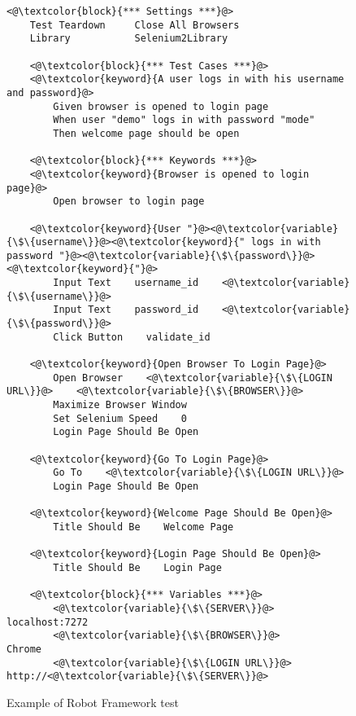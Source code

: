 \begin{figure}
\caption{Example of Robot Framework test}
\label{fig:robot-script}
\begin{minipage}{\linewidth}
\begin{lstlisting}[]
    <@\textcolor{block}{*** Settings ***}@>
    Test Teardown     Close All Browsers
    Library           Selenium2Library
    
    <@\textcolor{block}{*** Test Cases ***}@>
    <@\textcolor{keyword}{A user logs in with his username and password}@>
        Given browser is opened to login page
        When user "demo" logs in with password "mode"
        Then welcome page should be open
    
    <@\textcolor{block}{*** Keywords ***}@>
    <@\textcolor{keyword}{Browser is opened to login page}@>
        Open browser to login page
    
    <@\textcolor{keyword}{User "}@><@\textcolor{variable}{\$\{username\}}@><@\textcolor{keyword}{" logs in with password "}@><@\textcolor{variable}{\$\{password\}}@><@\textcolor{keyword}{"}@>
        Input Text    username_id    <@\textcolor{variable}{\$\{username\}}@>
        Input Text    password_id    <@\textcolor{variable}{\$\{password\}}@>
        Click Button    validate_id
    
    <@\textcolor{keyword}{Open Browser To Login Page}@>
        Open Browser    <@\textcolor{variable}{\$\{LOGIN URL\}}@>    <@\textcolor{variable}{\$\{BROWSER\}}@>
        Maximize Browser Window
        Set Selenium Speed    0
        Login Page Should Be Open        
    
    <@\textcolor{keyword}{Go To Login Page}@>
        Go To    <@\textcolor{variable}{\$\{LOGIN URL\}}@>
        Login Page Should Be Open
        
    <@\textcolor{keyword}{Welcome Page Should Be Open}@>
        Title Should Be    Welcome Page
        
    <@\textcolor{keyword}{Login Page Should Be Open}@>
        Title Should Be    Login Page
    
    <@\textcolor{block}{*** Variables ***}@>
        <@\textcolor{variable}{\$\{SERVER\}}@>           localhost:7272
        <@\textcolor{variable}{\$\{BROWSER\}}@>          Chrome        
        <@\textcolor{variable}{\$\{LOGIN URL\}}@>        http://<@\textcolor{variable}{\$\{SERVER\}}@>
\end{lstlisting}
\end{minipage}
\end{figure}

